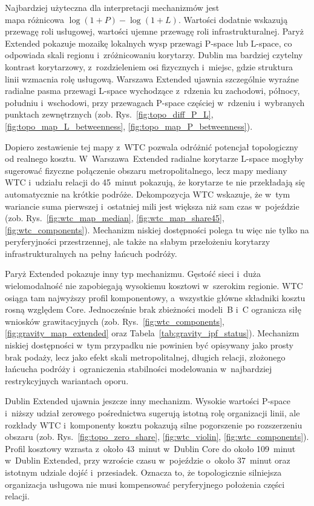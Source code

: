 \documentclass{pracamgr}
\begin{document}
Najbardziej użyteczna dla interpretacji mechanizmów jest \\mapa różnicowa \mbox{$\log(1+P)-\log(1+L)$}. Wartości dodatnie wskazują przewagę roli usługowej, wartości ujemne przewagę roli infrastrukturalnej. Paryż Extended pokazuje mozaikę lokalnych wysp przewagi \mbox{P-space} lub \mbox{L-space}, co odpowiada skali regionu i~zróżnicowaniu korytarzy. Dublin ma bardziej czytelny kontrast korytarzowy, z~rozdzieleniem osi fizycznych i~miejsc, gdzie struktura linii wzmacnia rolę usługową. Warszawa Extended ujawnia szczególnie wyraźne radialne pasma przewagi \mbox{L-space} wychodzące z~rdzenia ku zachodowi, północy, południu i~wschodowi, przy przewagach \mbox{P-space} częściej w~rdzeniu i~wybranych punktach zewnętrznych (zob. Rys.~\ref{fig:topo_diff_P_L}, \ref{fig:topo_map_L_betweenness}, \ref{fig:topo_map_P_betweenness}).

Dopiero zestawienie tej mapy z~\mbox{WTC} pozwala odróżnić potencjał topologiczny od realnego kosztu. W~\mbox{Warszawa~Extended} radialne korytarze \mbox{L-space} mogłyby sugerować fizyczne połączenie obszaru metropolitalnego, lecz mapy mediany \mbox{WTC} i~udziału relacji do 45~minut pokazują, że korytarze te nie przekładają się automatycznie na krótkie podróże. Dekompozycja \mbox{WTC} wskazuje, że w~tym wariancie suma pierwszej i~ostatniej mili jest większa niż sam czas w~pojeździe (zob. Rys.~\ref{fig:wtc_map_median}, \ref{fig:wtc_map_share45}, \ref{fig:wtc_components}). Mechanizm niskiej dostępności polega tu więc nie tylko na peryferyjności przestrzennej, ale także na słabym przełożeniu korytarzy infrastrukturalnych na pełny łańcuch podróży.

Paryż Extended pokazuje inny typ mechanizmu. Gęstość sieci i~duża wielomodalność nie zapobiegają wysokiemu kosztowi w~szerokim regionie. \mbox{WTC} osiąga tam najwyższy profil komponentowy, a~wszystkie główne składniki kosztu rosną względem \mbox{Core}. Jednocześnie brak zbieżności modeli~B i~C ogranicza siłę wniosków grawitacyjnych (zob. Rys.~\ref{fig:wtc_components}, \ref{fig:gravity_map_extended} oraz Tabela~\ref{tab:gravity_ipf_status}). Mechanizm niskiej dostępności w~tym przypadku nie powinien być opisywany jako prosty brak podaży, lecz jako efekt skali metropolitalnej, długich relacji, złożonego łańcucha podróży i~ograniczenia stabilności modelowania w~najbardziej restrykcyjnych wariantach oporu.

Dublin Extended ujawnia jeszcze inny mechanizm. Wysokie wartości \mbox{P-space} i~niższy udział zerowego pośrednictwa sugerują istotną rolę organizacji linii, ale rozkłady \mbox{WTC} i~komponenty kosztu pokazują silne pogorszenie po rozszerzeniu obszaru (zob. Rys.~\ref{fig:topo_zero_share}, \ref{fig:wtc_violin}, \ref{fig:wtc_components}). Profil kosztowy wzrasta z~około 43~minut w~Dublin Core do około 109~minut w~Dublin Extended, przy wzroście czasu w~pojeździe o~około 37~minut oraz istotnym udziale dojść i~przesiadek. Oznacza to, że topologicznie silniejsza organizacja usługowa nie musi kompensować peryferyjnego położenia części relacji.
\end{document}
